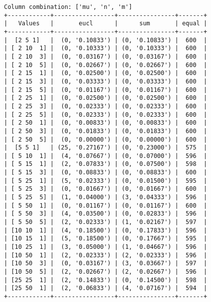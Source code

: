 \documentclass{article}
\begin{document}
\begin{verbatim}
Column combination: ['mu', 'n', 'm']
+------------+-----------------+----------------+-------+
|   Values   |       eucl      |      sum       | equal |
+------------+-----------------+----------------+-------+
|  [2 5 1]   |  (0, '0.10833') | (0, '0.10833') |  600  |
| [ 2 10  1] |  (0, '0.10333') | (0, '0.10333') |  600  |
| [ 2 10  3] |  (0, '0.03167') | (0, '0.03167') |  600  |
| [ 2 10  5] |  (0, '0.02667') | (0, '0.02667') |  600  |
| [ 2 15  1] |  (0, '0.02500') | (0, '0.02500') |  600  |
| [ 2 15  3] |  (0, '0.03333') | (0, '0.03333') |  600  |
| [ 2 15  5] |  (0, '0.01167') | (0, '0.01167') |  600  |
| [ 2 25  1] |  (0, '0.02500') | (0, '0.02500') |  600  |
| [ 2 25  3] |  (0, '0.02333') | (0, '0.02333') |  600  |
| [ 2 25  5] |  (0, '0.02333') | (0, '0.02333') |  600  |
| [ 2 50  1] |  (0, '0.00833') | (0, '0.00833') |  600  |
| [ 2 50  3] |  (0, '0.01833') | (0, '0.01833') |  600  |
| [ 2 50  5] |  (0, '0.00000') | (0, '0.00000') |  600  |
|  [5 5 1]   | (25, '0.27167') | (0, '0.23000') |  575  |
| [ 5 10  1] |  (4, '0.07667') | (0, '0.07000') |  596  |
| [ 5 15  1] |  (2, '0.07833') | (0, '0.07500') |  598  |
| [ 5 15  3] |  (0, '0.08833') | (0, '0.08833') |  600  |
| [ 5 25  1] |  (5, '0.02333') | (0, '0.01500') |  595  |
| [ 5 25  3] |  (0, '0.01667') | (0, '0.01667') |  600  |
| [ 5 25  5] |  (1, '0.04000') | (3, '0.04333') |  596  |
| [ 5 50  1] |  (0, '0.01167') | (0, '0.01167') |  600  |
| [ 5 50  3] |  (4, '0.03500') | (0, '0.02833') |  596  |
| [ 5 50  5] |  (2, '0.02333') | (1, '0.02167') |  597  |
| [10 10  1] |  (4, '0.18500') | (0, '0.17833') |  596  |
| [10 15  1] |  (5, '0.18500') | (0, '0.17667') |  595  |
| [10 25  1] |  (3, '0.05000') | (1, '0.04667') |  596  |
| [10 50  1] |  (2, '0.02333') | (2, '0.02333') |  596  |
| [10 50  3] |  (0, '0.03167') | (3, '0.03667') |  597  |
| [10 50  5] |  (2, '0.02667') | (2, '0.02667') |  596  |
| [25 25  1] |  (2, '0.14833') | (0, '0.14500') |  598  |
| [25 50  1] |  (2, '0.06833') | (4, '0.07167') |  594  |
+------------+-----------------+----------------+-------+
\end{verbatim}
\end{document}
